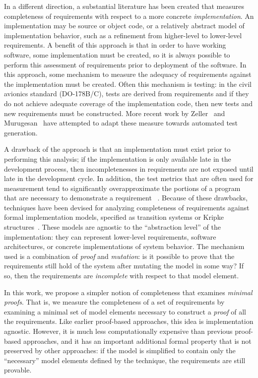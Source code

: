 In a different direction, a substantial literature has been created that measures completeness of requirements with respect to a more concrete {\em implementation}.  An implementation may be source or object code, or a relatively abstract model of implementation behavior, such as a refinement from higher-level to lower-level requirements.  A benefit of this approach is that in order to have working software, some implementation must be created, so it is always possible to perform this assessment of requirements prior to deployment of the software.  In this approach, some mechanism to measure the adequacy of requirements against the implementation must be created.  Often this mechanism is testing: in the civil avionics standard (DO-178B/C), tests are derived from requirements and if they do not achieve adequate coverage of the implementation code, then new tests and new requirements must be constructed.  More recent work by Zeller~\cite{} and Murugesan~\cite{} have attempted to adapt these measure towards automated test generation.

A drawback of the approach is that an implementation must exist prior to performing this analysis; if the implementation is only available late in the development process, then incompletenesses in requirements are not exposed until late in the development cycle.  In addition, the test metrics that are often used for measurement tend to significantly overapproximate the portions of a program that are necessary to demonstrate a requirement~\cite{} .  Because of these drawbacks, techniques have been devised for analyzing completeness of requirements against formal implementation models, specified as transition systems or Kripke structures~\cite{}.  These models are agnostic to the ``abstraction level'' of the implementation: they can represent lower-level requirements, software architectures, or concrete implementations of system behavior.  The mechanism used is a combination of {\em proof} and {\em mutation}: is it possible to prove that the requirements still hold of the system after mutating the model in some way?  If so, then the requirements are {\em incomplete} with respect to that model element.

In this work, we propose a simpler notion of completeness that examines {\em minimal proofs}.  That is, we measure the completeness of a set of requirements by examining a minimal set of model elements necessary to construct a {\em proof} of all the requirements.  Like earlier proof-based approaches, this idea is implementation agnostic.  However, it is much less computationally expensive than previous proof-based approaches, and it has an important additional formal property that is not preserved by other approaches: if the model is simplified to contain only the ``necessary'' model elements defined by the technique, the requirements are still provable.

